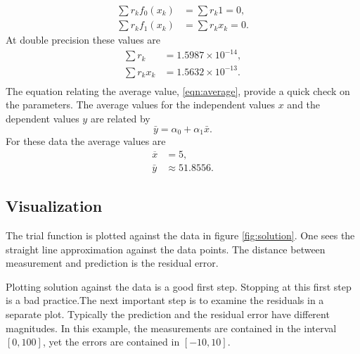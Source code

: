   \begin{equation}
    \begin{split}
      \sum r_{k} f_{0}(x_{k}) &= \sum r_{k} 1 = 0,\\
      \sum r_{k} f_{1}(x_{k}) &= \sum r_{k} x_{k} = 0.
    \end{split}
  \end{equation}
At double precision these values are
  \begin{equation}
    \begin{split}
      \sum r_{k}       &= 1.5987\times 10^{-14}, \\
      \sum r_{k} x_{k} &= 1.5632\times 10^{-13}. \\
    \end{split}
  \end{equation}
The equation relating the average value, \eqref{eqn:average}, provide a quick check on the parameters. The average values for the independent values $x$ and the dependent values $y$ are related by
  \begin{equation}
    \bar{y} = \alpha_{0} + \alpha_{1} \bar{x}.
  \end{equation}
For these data the average values are
  \begin{equation}
    \begin{split}
      \overline{x} &= 5, \\
      \bar{y} &\approx 51.8556.
    \end{split}
  \end{equation}
\subsection{Visualization}
The trial function is plotted against the data in figure \eqref{fig:solution}. One sees the straight line approximation against the data points. The distance between measurement and prediction is the residual error. 

Plotting solution against the data is a good first step. Stopping at this first step is a bad practice.The next important step is to examine the residuals in a separate plot. Typically the prediction and the residual error have different magnitudes. In this example, the measurements are contained in the interval $[0, 100]$, yet the errors are contained in $[-10,10]$.


